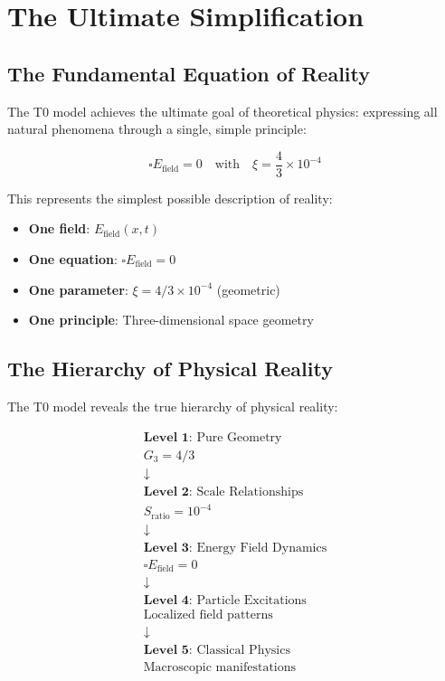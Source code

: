 \documentclass[12pt,a4paper]{report}
\begin{document}
\section{The Ultimate Simplification}
\label{sec:ultimate_simplification}

\subsection{The Fundamental Equation of Reality}
\label{subsec:fundamental_equation}

The T0 model achieves the ultimate goal of theoretical physics: expressing all natural phenomena through a single, simple principle:

\begin{equation}
	\boxed{\square E_{\text{field}} = 0 \quad \text{with} \quad \xi = \frac{4}{3} \times 10^{-4}}
\end{equation}

This represents the simplest possible description of reality:
\begin{itemize}
	\item \textbf{One field}: $E_{\text{field}}(x,t)$
	\item \textbf{One equation}: $\square E_{\text{field}} = 0$
	\item \textbf{One parameter}: $\xi = 4/3 \times 10^{-4}$ (geometric)
	\item \textbf{One principle}: Three-dimensional space geometry
\end{itemize}

\subsection{The Hierarchy of Physical Reality}
\label{subsec:hierarchy_reality}

The T0 model reveals the true hierarchy of physical reality:

\begin{equation}
	\begin{array}{c}
		\textbf{Level 1:} \text{ Pure Geometry} \\
		G_3 = 4/3 \\
		\downarrow \\
		\textbf{Level 2:} \text{ Scale Relationships} \\
		S_{\text{ratio}} = 10^{-4} \\
		\downarrow \\
		\textbf{Level 3:} \text{ Energy Field Dynamics} \\
		\square E_{\text{field}} = 0 \\
		\downarrow \\
		\textbf{Level 4:} \text{ Particle Excitations} \\
		\text{Localized field patterns} \\
		\downarrow \\
		\textbf{Level 5:} \text{ Classical Physics} \\
		\text{Macroscopic manifestations}
	\end{array}
\end{equation}
\end{document}

